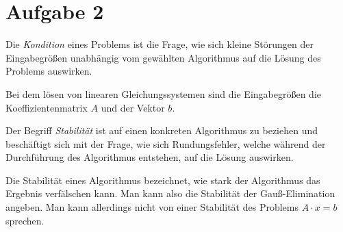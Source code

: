 \section*{Aufgabe 2}
Die \emph{Kondition} eines Problems ist die Frage, wie sich kleine Störungen
der Eingabegrößen unabhängig vom gewählten Algorithmus auf die
Lösung des Problems auswirken.

Bei dem lösen von linearen Gleichungssystemen sind die Eingabegrößen
die Koeffizientenmatrix $A$ und der Vektor $b$.

Der Begriff \emph{Stabilität} ist auf einen konkreten Algorithmus
zu beziehen und beschäftigt sich mit der Frage, wie sich Rundungsfehler,
welche während der Durchführung des Algorithmus entstehen, auf
die Lösung auswirken.

Die Stabilität eines Algorithmus bezeichnet, wie stark der Algorithmus das Ergebnis verfälschen kann. Man kann also die Stabilität der Gauß-Elimination angeben. Man kann allerdings nicht von einer Stabilität des Problems $A \cdot x = b$ sprechen.
